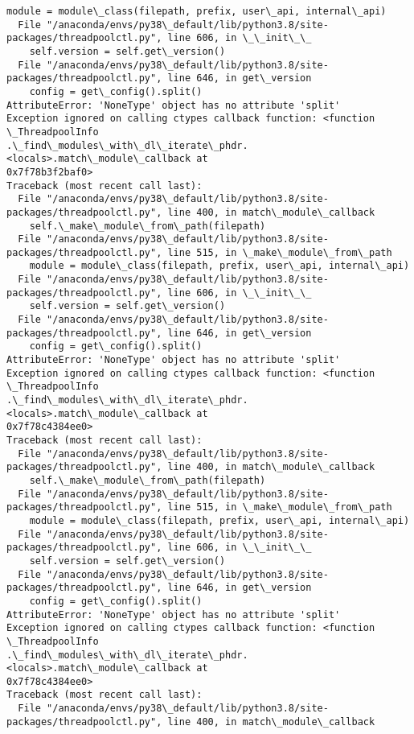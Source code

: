 \documentclass[11pt]{article}
\begin{document}
\begin{Verbatim}[commandchars=\\\{\}]
    module = module\_class(filepath, prefix, user\_api, internal\_api)
  File "/anaconda/envs/py38\_default/lib/python3.8/site-
packages/threadpoolctl.py", line 606, in \_\_init\_\_
    self.version = self.get\_version()
  File "/anaconda/envs/py38\_default/lib/python3.8/site-
packages/threadpoolctl.py", line 646, in get\_version
    config = get\_config().split()
AttributeError: 'NoneType' object has no attribute 'split'
Exception ignored on calling ctypes callback function: <function \_ThreadpoolInfo
.\_find\_modules\_with\_dl\_iterate\_phdr.<locals>.match\_module\_callback at
0x7f78b3f2baf0>
Traceback (most recent call last):
  File "/anaconda/envs/py38\_default/lib/python3.8/site-
packages/threadpoolctl.py", line 400, in match\_module\_callback
    self.\_make\_module\_from\_path(filepath)
  File "/anaconda/envs/py38\_default/lib/python3.8/site-
packages/threadpoolctl.py", line 515, in \_make\_module\_from\_path
    module = module\_class(filepath, prefix, user\_api, internal\_api)
  File "/anaconda/envs/py38\_default/lib/python3.8/site-
packages/threadpoolctl.py", line 606, in \_\_init\_\_
    self.version = self.get\_version()
  File "/anaconda/envs/py38\_default/lib/python3.8/site-
packages/threadpoolctl.py", line 646, in get\_version
    config = get\_config().split()
AttributeError: 'NoneType' object has no attribute 'split'
Exception ignored on calling ctypes callback function: <function \_ThreadpoolInfo
.\_find\_modules\_with\_dl\_iterate\_phdr.<locals>.match\_module\_callback at
0x7f78c4384ee0>
Traceback (most recent call last):
  File "/anaconda/envs/py38\_default/lib/python3.8/site-
packages/threadpoolctl.py", line 400, in match\_module\_callback
    self.\_make\_module\_from\_path(filepath)
  File "/anaconda/envs/py38\_default/lib/python3.8/site-
packages/threadpoolctl.py", line 515, in \_make\_module\_from\_path
    module = module\_class(filepath, prefix, user\_api, internal\_api)
  File "/anaconda/envs/py38\_default/lib/python3.8/site-
packages/threadpoolctl.py", line 606, in \_\_init\_\_
    self.version = self.get\_version()
  File "/anaconda/envs/py38\_default/lib/python3.8/site-
packages/threadpoolctl.py", line 646, in get\_version
    config = get\_config().split()
AttributeError: 'NoneType' object has no attribute 'split'
Exception ignored on calling ctypes callback function: <function \_ThreadpoolInfo
.\_find\_modules\_with\_dl\_iterate\_phdr.<locals>.match\_module\_callback at
0x7f78c4384ee0>
Traceback (most recent call last):
  File "/anaconda/envs/py38\_default/lib/python3.8/site-
packages/threadpoolctl.py", line 400, in match\_module\_callback

\end{Verbatim}
\end{document}
